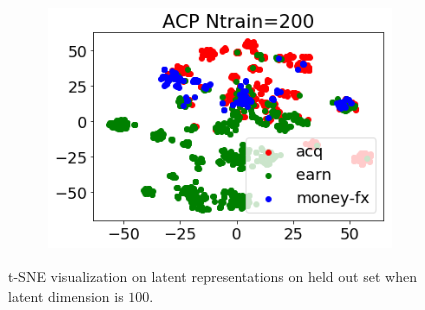 \documentclass[twoside]{article}
\begin{document}
\begin{figure}
\begin{subfigure}[t]{0.33\textwidth}
        \label{fig: reuters_h100_acp_500}
    \end{subfigure}%
    ~
    \begin{subfigure}[t]{0.33\textwidth}
        \centering
        \includegraphics[width=1.0\linewidth]{reuters_acp200.png}
        \label{fig: reuters_h100_acp_200}
    \end{subfigure}%
\caption{\small t-SNE visualization on latent representations on held out set when latent dimension is $100$.}
\label{fig: reuters_hvis}
\end{figure}
\end{document}

